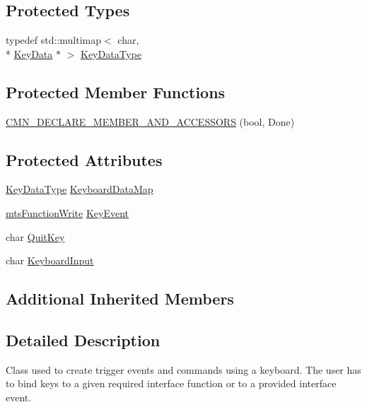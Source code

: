 \subsection*{Protected Types}
\begin{DoxyCompactItemize}
\item 
typedef std\-::multimap$<$ char, \\*
\hyperlink{structmts_keyboard_1_1_key_data}{Key\-Data} $\ast$ $>$ \hyperlink{classmts_keyboard_a48126bc1793ac0b9c701cdb3cb9c3881}{Key\-Data\-Type}
\end{DoxyCompactItemize}
\subsection*{Protected Member Functions}
\begin{DoxyCompactItemize}
\item 
\hyperlink{classmts_keyboard_a03a2bed2d8e35bc5e55618656374cd9e}{C\-M\-N\-\_\-\-D\-E\-C\-L\-A\-R\-E\-\_\-\-M\-E\-M\-B\-E\-R\-\_\-\-A\-N\-D\-\_\-\-A\-C\-C\-E\-S\-S\-O\-R\-S} (bool, Done)
\end{DoxyCompactItemize}
\subsection*{Protected Attributes}
\begin{DoxyCompactItemize}
\item 
\hyperlink{classmts_keyboard_a48126bc1793ac0b9c701cdb3cb9c3881}{Key\-Data\-Type} \hyperlink{classmts_keyboard_acb0628dad536242f1253245106a1e71f}{Keyboard\-Data\-Map}
\item 
\hyperlink{classmts_function_write}{mts\-Function\-Write} \hyperlink{classmts_keyboard_afdd1b226b01e8d9da4c14b83c7c61b82}{Key\-Event}
\item 
char \hyperlink{classmts_keyboard_a46f3784b9176a49b7782d927a0cea892}{Quit\-Key}
\item 
char \hyperlink{classmts_keyboard_a23ecc71912ee8cf5f722a93a1a29613e}{Keyboard\-Input}
\end{DoxyCompactItemize}
\subsection*{Additional Inherited Members}


\subsection{Detailed Description}
Class used to create trigger events and commands using a keyboard. The user has to bind keys to a given required interface function or to a provided interface event.

